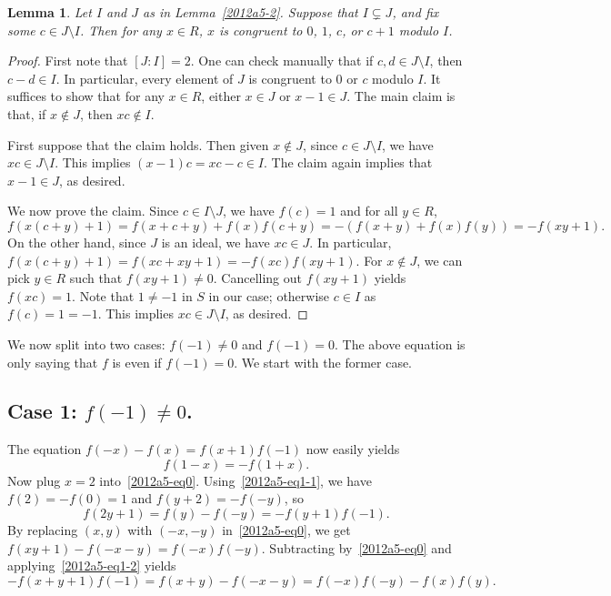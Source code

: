 \documentclass{article}
\newtheorem{lemma}{Lemma}
\begin{document}
\begin{lemma}\label{2012a5-3}
Let $I$ and $J$ as in Lemma~\ref{2012a5-2}.
Suppose that $I \subsetneq J$, and fix some $c \in J \setminus I$.
Then for any $x \in R$, $x$ is congruent to $0$, $1$, $c$, or $c + 1$ modulo $I$.
\end{lemma}
\begin{proof}
First note that $[J : I] = 2$.
One can check manually that if $c, d \in J \setminus I$, then $c - d \in I$.
In particular, every element of $J$ is congruent to $0$ or $c$ modulo $I$.
It suffices to show that for any $x \in R$, either $x \in J$ or $x - 1 \in J$.
The main claim is that, if $x \notin J$, then $xc \notin I$.

First suppose that the claim holds.
Then given $x \notin J$, since $c \in J \setminus I$, we have $xc \in J \setminus I$.
This implies $(x - 1) c = xc - c \in I$.
The claim again implies that $x - 1 \in J$, as desired.

We now prove the claim.
Since $c \in I \setminus J$, we have $f(c) = 1$ and for all $y \in R$,
\[ f(x(c + y) + 1) = f(x + c + y) + f(x) f(c + y) = -(f(x + y) + f(x) f(y)) = -f(xy + 1). \]
On the other hand, since $J$ is an ideal, we have $xc \in J$.
In particular, $f(x(c + y) + 1) = f(xc + xy + 1) = -f(xc) f(xy + 1)$.
For $x \notin J$, we can pick $y \in R$ such that $f(xy + 1) \neq 0$.
Cancelling out $f(xy + 1)$ yields $f(xc) = 1$.
Note that $1 \neq -1$ in $S$ in our case; otherwise $c \in I$ as $f(c) = 1 = -1$.
This implies $xc \in J \setminus I$, as desired.
\end{proof}

We now split into two cases: $f(-1) \neq 0$ and $f(-1) = 0$.
The above equation is only saying that $f$ is even if $f(-1) = 0$.
We start with the former case.



\subsection*{Case 1: $f(-1) \neq 0$.}

The equation $f(-x) - f(x) = f(x + 1) f(-1)$ now easily yields
\[ f(1 - x) = -f(1 + x). \tag{1.1}\label{2012a5-eq1-1} \]
Now plug $x = 2$ into~\eqref{2012a5-eq0}.
Using~\eqref{2012a5-eq1-1}, we have $f(2) = -f(0) = 1$ and $f(y + 2) = -f(-y)$, so
\[ f(2y + 1) = f(y) - f(-y) = -f(y + 1) f(-1). \tag{1.2}\label{2012a5-eq1-2} \]
By replacing $(x, y)$ with $(-x, -y)$ in~\eqref{2012a5-eq0}, we get $f(xy + 1) - f(-x - y) = f(-x) f(-y)$.
Subtracting by~\eqref{2012a5-eq0} and applying~\eqref{2012a5-eq1-2} yields
\[ -f(x + y + 1) f(-1) = f(x + y) - f(-x - y) = f(-x) f(-y) - f(x) f(y). \tag{1.3}\label{2012a5-eq1-3} \]
\end{document}
